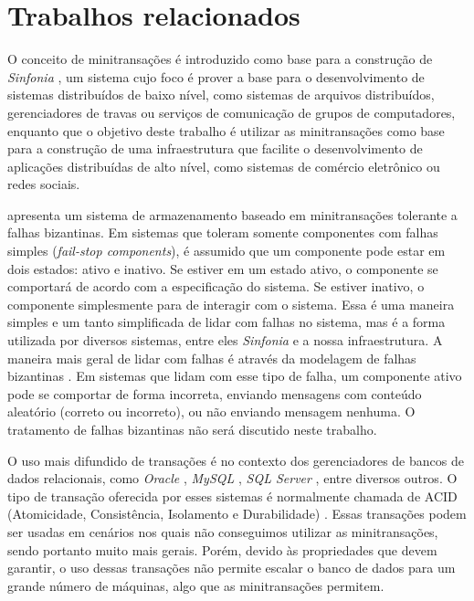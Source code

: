 \documentclass[11pt,twoside,a4paper]{book}
\begin{document}
\section{Trabalhos relacionados}
\label{sec:trabalhos_relacionados}
O conceito de minitransações é introduzido como base para a construção de
\emph{Sinfonia} \cite{sinfonia}, um sistema cujo foco é prover a base para o
desenvolvimento de sistemas distribuídos de baixo nível, como sistemas de arquivos distribuídos, 
gerenciadores de travas ou serviços de comunicação de grupos de computadores, enquanto que o objetivo 
deste trabalho é utilizar as minitransações como base para a construção de uma infraestrutura que facilite 
o desenvolvimento de aplicações distribuídas de alto nível, como sistemas de comércio eletrônico ou redes sociais.

\cite{padilha} apresenta um sistema de armazenamento baseado em minitransações tolerante a falhas bizantinas. Em sistemas 
que toleram somente componentes com falhas simples (\emph{fail-stop components}), é assumido que um componente pode estar 
em dois estados: ativo e inativo. Se estiver em um estado ativo, o componente se comportará de acordo com a especificação 
do sistema. Se estiver inativo, o componente simplesmente para de interagir com o sistema. Essa é uma maneira simples e um 
tanto simplificada de lidar com falhas no sistema, mas é a forma utilizada por diversos sistemas, entre eles \emph{Sinfonia} 
e a nossa infraestrutura. A maneira mais geral de lidar com falhas é através
da modelagem de falhas bizantinas \cite{byzantine}. Em sistemas que lidam com
esse tipo de falha, um componente ativo pode se comportar de forma incorreta, enviando mensagens com conteúdo aleatório 
(correto ou incorreto), ou não enviando mensagem nenhuma. O tratamento de falhas bizantinas não será discutido neste trabalho.

O uso mais difundido de transações é no contexto dos gerenciadores de bancos
de dados relacionais, como \emph{Oracle} \cite{oracle}, \emph{MySQL}
\cite{mysql}, \emph{SQL Server} \cite{sqlserver}, entre diversos outros.
O tipo de transação oferecida por esses sistemas é normalmente chamada de ACID (Atomicidade, Consistência, Isolamento e Durabilidade) 
\cite{vaca}. Essas transações podem ser usadas em cenários nos quais não conseguimos utilizar as minitransações, sendo portanto 
muito mais gerais. Porém, devido às propriedades que devem garantir, o uso dessas transações não permite escalar o banco de dados 
para um grande número de máquinas, algo que as minitransações permitem.
\end{document}
